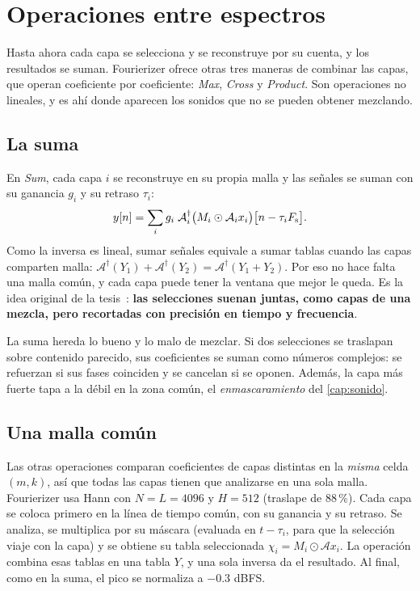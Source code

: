 \chapter{Operaciones entre espectros}\label{cap:operaciones}

Hasta ahora cada capa se selecciona y se reconstruye por su cuenta, y los resultados se suman.
Fourierizer ofrece otras tres maneras de combinar las capas, que operan coeficiente por
coeficiente: \emph{Max}, \emph{Cross} y \emph{Product}. Son operaciones no lineales, y es ahí donde
aparecen los sonidos que no se pueden obtener mezclando.

\section{La suma}

En \emph{Sum}, cada capa $i$ se reconstruye en su propia malla y las señales se suman con su
ganancia $g_i$ y su retraso $\tau_i$:
\[
  y[n]=\sum_i g_i\;\mathcal A_i^{\dagger}\bigl(M_i\odot\mathcal A_i x_i\bigr)\bigl[n-\tau_iF_{\mathrm{s}}\bigr].
\]
Como la inversa es lineal, sumar señales equivale a sumar tablas cuando las capas comparten malla:
$\mathcal A^{\dagger}(Y_1)+\mathcal A^{\dagger}(Y_2)=\mathcal A^{\dagger}(Y_1+Y_2)$. Por eso no hace
falta una malla común, y cada capa puede tener la ventana que mejor le queda. Es la idea original de
la tesis~\cite{rodriguez2025}: \textbf{las selecciones suenan juntas, como capas de una mezcla, pero
recortadas con precisión en tiempo y frecuencia}.

La suma hereda lo bueno y lo malo de mezclar. Si dos selecciones se traslapan sobre contenido
parecido, sus coeficientes se suman como números complejos: se refuerzan si sus fases coinciden y
se cancelan si se oponen. Además, la capa más fuerte tapa a la débil en la zona común, el
\emph{enmascaramiento} del \cref{cap:sonido}.

\section{Una malla común}

Las otras operaciones comparan coeficientes de capas distintas en la \emph{misma} celda $(m,k)$,
así que todas las capas tienen que analizarse en una sola malla. Fourierizer usa Hann con
$N=L=4096$ y $H=512$ (traslape de 88\,\%). Cada capa se coloca primero en la línea de tiempo
común, con su ganancia y su retraso. Se analiza, se multiplica por su máscara (evaluada en
$t-\tau_i$, para que la selección viaje con la capa) y se obtiene su tabla seleccionada
$\chi_i=M_i\odot\mathcal Ax_i$. La operación combina esas tablas en una tabla $Y$, y una sola
inversa da el resultado. Al final, como en la suma, el pico se normaliza a $-0.3$ dBFS.

